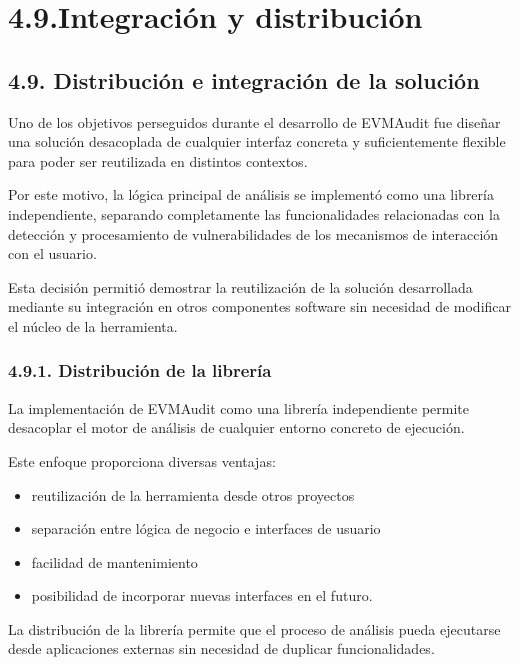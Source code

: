 \section{4.9.Integración y
distribución}\label{integraciuxf3n-y-distribuciuxf3n}

\subsection{4.9. Distribución e integración de la
solución}\label{distribuciuxf3n-e-integraciuxf3n-de-la-soluciuxf3n}

Uno de los objetivos perseguidos durante el desarrollo de EVMAudit fue
diseñar una solución desacoplada de cualquier interfaz concreta y
suficientemente flexible para poder ser reutilizada en distintos
contextos.

Por este motivo, la lógica principal de análisis se implementó como una
librería independiente, separando completamente las funcionalidades
relacionadas con la detección y procesamiento de vulnerabilidades de los
mecanismos de interacción con el usuario.

Esta decisión permitió demostrar la reutilización de la solución
desarrollada mediante su integración en otros componentes software sin
necesidad de modificar el núcleo de la herramienta.

\subsubsection{4.9.1. Distribución de la
librería}\label{distribuciuxf3n-de-la-libreruxeda}

La implementación de EVMAudit como una librería independiente permite
desacoplar el motor de análisis de cualquier entorno concreto de
ejecución.

Este enfoque proporciona diversas ventajas:

\begin{itemize}
\tightlist
\item
  reutilización de la herramienta desde otros proyectos
\item
  separación entre lógica de negocio e interfaces de usuario
\item
  facilidad de mantenimiento
\item
  posibilidad de incorporar nuevas interfaces en el futuro.
\end{itemize}

La distribución de la librería permite que el proceso de análisis pueda
ejecutarse desde aplicaciones externas sin necesidad de duplicar
funcionalidades.

